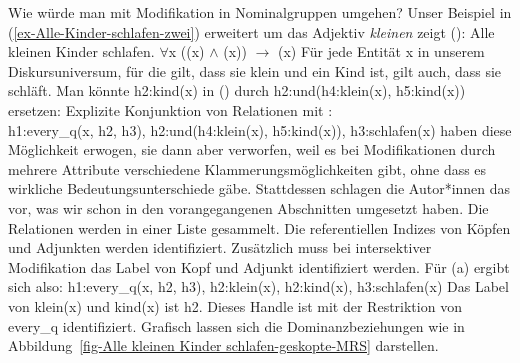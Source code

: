 Wie würde man mit Modifikation in Nominalgruppen umgehen? Unser Beispiel in (\ref{ex-Alle-Kinder-schlafen-zwei}) erweitert um das
Adjektiv \emph{kleinen} zeigt ():
\eal
\ex Alle kleinen Kinder schlafen.
\ex\label{ex-Aussagenlogik-Alle kleinen Kinder schlafen}
$\forall$x ((x) $\wedge$ (x)) $\to$ (x)
\ex Für jede Entität x in unserem Diskursuniversum, für die gilt, dass sie klein und ein Kind ist, gilt auch,
dass sie schläft.
\zl
Man könnte h2:kind(x) in () durch h2:und(h4:klein(x), h5:kind(x))
ersetzen:
\ea
Explizite Konjunktion von Relationen mit :\\
h1:every\_q(x, h2, h3), h2:und(h4:klein(x), h5:kind(x)), h3:schlafen(x)
\z
\citet[]{CFPS2005a} haben diese Möglichkeit erwogen, sie dann aber verworfen, weil es bei
Modifikationen durch mehrere Attribute verschiedene Klammerungsmöglichkeiten gibt, ohne dass es
wirkliche Bedeutungsunterschiede gäbe. Stattdessen schlagen die Autor*innen das vor, was wir schon
in den vorangegangenen Abschnitten umgesetzt haben. Die Relationen werden in einer Liste
gesammelt. Die referentiellen Indizes von Köpfen und Adjunkten werden identifiziert. Zusätzlich muss
bei intersektiver Modifikation das Label von Kopf und Adjunkt identifiziert werden.
Für (a) ergibt sich also:
\ea
\label{ex-every-klein-kind-schlafen}
h1:every\_q(x, h2, h3), h2:klein(x), h2:kind(x), h3:schlafen(x)
\z
Das Label von klein(x) und kind(x) ist h2. Dieses Handle ist mit der Restriktion von every\_q
identifiziert. Grafisch lassen sich die Dominanzbeziehungen wie in Abbildung~\ref{fig-Alle
  kleinen Kinder schlafen-geskopte-MRS} darstellen.

